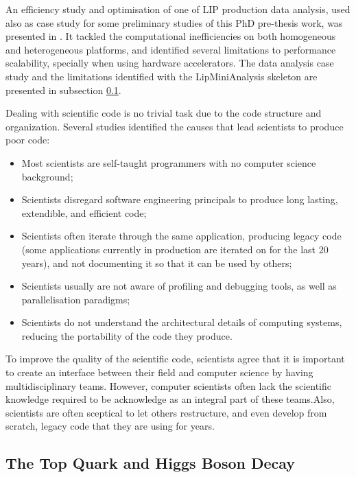 An efficiency study and optimisation of one of LIP production data analysis, used also as case study for some preliminary studies of this PhD pre-thesis work, was presented in \cite{Msc:AMP,paperAMP}. It tackled the computational inefficiencies on both homogeneous and heterogeneous platforms, and identified several limitations to performance scalability, specially when using hardware accelerators. The data analysis case study and the limitations identified with the LipMiniAnalysis skeleton are presented in subsection \ref{ttH}.

Dealing with scientific code is no trivial task due to the code structure and organization. Several studies \cite{SC:Nature,SC:Develop,SC:SC11} identified the causes that lead scientists to produce poor code:

\begin{center}
	\begin{itemize}
		\item Most scientists are self-taught programmers with no computer science background;
		\item Scientists disregard software engineering principals to produce long lasting, extendible, and efficient code;
		\item Scientists often iterate through the same application, producing legacy code (some applications currently in production are iterated on for the last 20 years), and not documenting it so that it can be used by others;
		\item Scientists usually are not aware of profiling and debugging tools, as well as parallelisation paradigms;
		\item Scientists do not understand the architectural details of computing systems, reducing the portability of the code they produce.
	\end{itemize}
\end{center}

To improve the quality of the scientific code, scientists agree that it is important to create an interface between their field and computer science by having multidisciplinary teams. However, computer scientists often lack the scientific knowledge required to be acknowledge as an integral part of these teams.Also, scientists are often sceptical to let others restructure, and even develop from scratch, legacy code that they are using for years.

\subsection{The Top Quark and Higgs Boson Decay}
\label{ttH}

